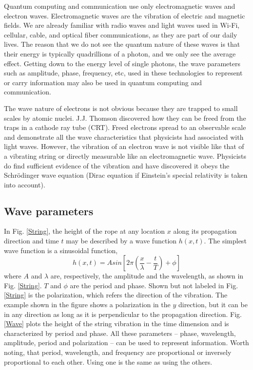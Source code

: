 \documentclass[oneside, letter, 12pt]{book}
\begin{document}
Quantum computing and communication use only electromagnetic waves and electron waves. Electromagnetic waves are the vibration of electric and magnetic fields. We are already familiar with radio waves and light waves used in Wi-Fi, cellular, cable, and optical fiber communications, as they are part of our daily lives. The reason that we do not see the quantum nature of these waves is that their energy is typically quadrillions of a photon, and we only see the average effect. Getting down to the energy level of single photons, the wave parameters such as amplitude, phase, frequency, etc, used in these technologies to represent or carry information may also be used in quantum computing and communication.

The wave nature of electrons is not obvious because they are trapped to small scales by atomic nuclei. J.J. Thomson discovered how they can be freed from the traps\cite{THOMSON} in a cathode ray tube (CRT). Freed electrons spread to an observable scale and demonstrate all the wave characteristics that physicists had associated with light waves. However, the vibration of an electron wave is not visible like that of a vibrating string or directly measurable like an electromagnetic wave. Physicists do find sufficient evidence of the vibration and have discovered it obeys the Schrödinger wave equation (Dirac equation if Einstein's special relativity is taken into account).

\subsection{Wave parameters}
In Fig. \ref{String}, the height of the rope at any location $x$ along its propagation direction and time $t$ may be described by a wave function $h(x,t)$. The simplest wave function is a sinusoidal function,
\begin{equation}\label{e-hWave}
    h(x,t) = A sin[2\pi (\frac x \lambda - \frac t T) +\phi]
\end{equation}
where $A$ and $\lambda$ are, respectively, the amplitude and the wavelength, as shown in Fig. \ref{String}. $T$ and $\phi$ are the period and phase. Shown but not labeled in Fig. \ref{String} is the polarization, which refers the direction of the vibration. The example shown in the figure shows a polarization in the $y$ direction, but it can be in any direction as long as it is perpendicular to the propagation direction. Fig. \ref{Wave} plots the height of the string vibration in the time dimension and is characterized by period and phase. All these parameters -- phase, wavelength, amplitude, period and polarization -- can be used to represent information. Worth noting, that period, wavelength, and frequency are proportional or inversely proportional to each other. Using one is the same as using the others.
\end{document}
